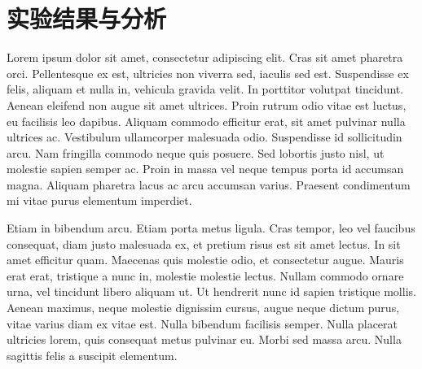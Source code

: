 \documentclass{zjureport}
\begin{document}
\section{实验结果与分析}

  Lorem ipsum dolor sit amet, consectetur adipiscing elit. Cras sit amet pharetra orci. Pellentesque ex est, ultricies non viverra sed, iaculis sed est. Suspendisse ex felis, aliquam et nulla in, vehicula gravida velit. In porttitor volutpat tincidunt. Aenean eleifend non augue sit amet ultrices. Proin rutrum odio vitae est luctus, eu facilisis leo dapibus. Aliquam commodo efficitur erat, sit amet pulvinar nulla ultrices ac. Vestibulum ullamcorper malesuada odio. Suspendisse id sollicitudin arcu. Nam fringilla commodo neque quis posuere. Sed lobortis justo nisl, ut molestie sapien semper ac. Proin in massa vel neque tempus porta id accumsan magna. Aliquam pharetra lacus ac arcu accumsan varius. Praesent condimentum mi vitae purus elementum imperdiet.

  Etiam in bibendum arcu. Etiam porta metus ligula. Cras tempor, leo vel faucibus consequat, diam justo malesuada ex, et pretium risus est sit amet lectus. In sit amet efficitur quam. Maecenas quis molestie odio, et consectetur augue. Mauris erat erat, tristique a nunc in, molestie molestie lectus. Nullam commodo ornare urna, vel tincidunt libero aliquam ut. Ut hendrerit nunc id sapien tristique mollis. Aenean maximus, neque molestie dignissim cursus, augue neque dictum purus, vitae varius diam ex vitae est. Nulla bibendum facilisis semper. Nulla placerat ultricies lorem, quis consequat metus pulvinar eu. Morbi sed massa arcu. Nulla sagittis felis a suscipit elementum.
\end{document}
